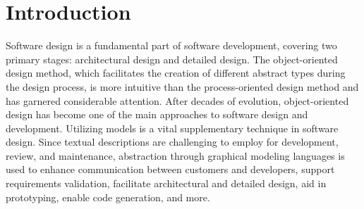 \documentclass[pdflatex,sn-mathphys-num]{sn-jnl}%
\theoremstyle{thmstyleone}%
\theoremstyle{thmstyletwo}%
\theoremstyle{thmstylethree}%
\begin{document}

\maketitle

\section{Introduction}\label{sec1}

Software design is a fundamental part of software development, covering two primary stages: architectural design and detailed design\cite{Design1}. The object-oriented design method, which facilitates the creation of different abstract types during the design process, is more intuitive than the process-oriented design method and has garnered considerable attention. After decades of evolution, object-oriented design has become one of the main approaches to software design and development\cite{flageol_mapping_2023}.
Utilizing models is a vital supplementary technique in software design. 
Since textual descriptions are challenging to employ for development, review, and maintenance, abstraction through graphical modeling languages is used to enhance communication between customers and developers, support requirements validation, facilitate architectural and detailed design, aid in prototyping, enable code generation, and more. 
\end{document}
